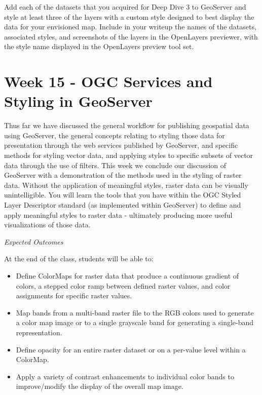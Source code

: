 \documentclass[]{book}
\providecommand{\tightlist}{%
  \setlength{\itemsep}{0pt}\setlength{\parskip}{0pt}}
\begin{document}
Add each of the datasets that you acquired for Deep Dive 3 to GeoServer
and style at least three of the layers with a custom style designed to
best display the data for your envisioned map. Include in your writeup
the names of the datasets, associated styles, and screenshots of the
layers in the OpenLayers previewer, with the style name displayed in the
OpenLayers preview tool set.

\chapter{Week 15 - OGC Services and Styling in GeoServer}\label{week15}

Thus far we have discussed the general workflow for publishing
geospatial data using GeoServer, the general concepts relating to
styling those data for presentation through the web services published
by GeoServer, and specific methods for styling vector data, and applying
styles to specific subsets of vector data through the use of filters.
This week we conclude our discussion of GeoServer with a demonstration
of the methods used in the styling of raster data. Without the
application of meaningful styles, raster data can be visually
unintelligible. You will learn the tools that you have within the OGC
Styled Layer Descriptor standard (as implemented within GeoServer) to
define and apply meaningful styles to raster data - ultimately producing
more useful visualizations of those data.

\emph{Expected Outcomes}

At the end of the class, students will be able to:

\begin{itemize}
\tightlist
\item
  Define ColorMaps for raster data that produce a continuous gradient of
  colors, a stepped color ramp between defined raster values, and color
  assignments for specific raster values.
\item
  Map bands from a multi-band raster file to the RGB colors used to
  generate a color map image or to a single grayscale band for
  generating a single-band representation.
\item
  Define opacity for an entire raster dataset or on a per-value level
  within a ColorMap.
\item
  Apply a variety of contrast enhancements to individual color bands to
  improve/modify the display of the overall map image.
\end{itemize}
\end{document}
